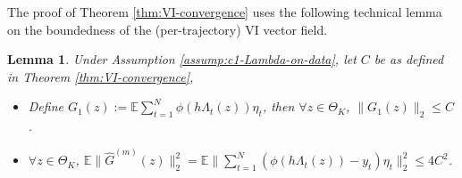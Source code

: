 \documentclass[11pt]{article}
\newtheorem{lemma}[theorem]{Lemma}
\theoremstyle{remark}
\theoremstyle{plain}
\newcommand{\E}{\mathbb{E}}
\begin{document}
%
The proof of Theorem \ref{thm:VI-convergence}  uses the following technical lemma on the boundedness of the (per-trajectory) VI vector field.
\begin{lemma}\label{lemma:boundedness-VI}
Under Assumption \ref{assump:c1-Lambda-on-data}, 
let  $C$ be as defined in Theorem \ref{thm:VI-convergence},
\begin{itemize}
\item[(i)] Define $G_1(z) :=  \E \sum_{t=1}^N \phi( h \Lambda_t(z)) \eta_t $, 
then $\forall z \in \Theta_K$, $\| G_1(z) \|_2 \le C$.
\item[(ii)] $\forall z \in \Theta_K$, 
$\E \| \hat G^{(m)}( z )  \|_2^2 =  \E \| \sum_{t=1}^N \left(\phi( h \Lambda_t (z)) - y_t \right) \eta_t \|_2^2 
\le 4 C^2$.
\end{itemize}
\end{lemma}
%
\end{document}
